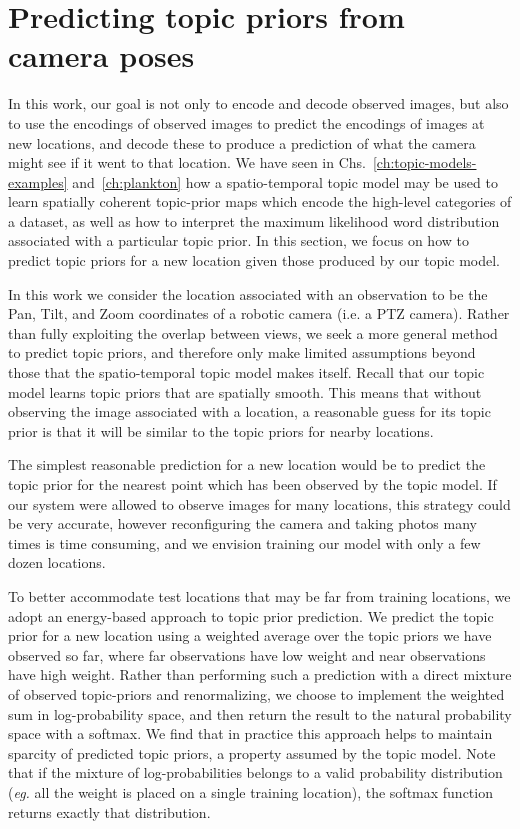 \section{Predicting topic priors from camera poses} \label{sec:spatial-prediction-spatial-model}
In this work, our goal is not only to encode and decode observed images, but also to use the encodings of observed images to predict the encodings of images at new locations, and decode these to produce a prediction of what the camera might see if it went to that location. We have seen in Chs.~\ref{ch:topic-models-examples} and~\ref{ch:plankton} how a spatio-temporal topic model may be used to learn spatially coherent topic-prior maps which encode the high-level categories of a dataset, as well as how to interpret the maximum likelihood word distribution associated with a particular topic prior. In this section, we focus on how to predict topic priors for a new location given those produced by our topic model.

In this work we consider the location associated with an observation to be the Pan, Tilt, and Zoom coordinates of a robotic camera (i.e. a PTZ camera). Rather than fully exploiting the overlap between views, we seek a more general method to predict topic priors, and therefore only make limited assumptions beyond those that the spatio-temporal topic model makes itself. Recall that our topic model learns topic priors that are spatially smooth. This means that without observing the image associated with a location, a reasonable guess for its topic prior is that it will be similar to the topic priors for nearby locations.

The simplest reasonable prediction for a new location would be to predict the topic prior for the nearest point which has been observed by the topic model. If our system were allowed to observe images for many locations, this strategy could be very accurate, however reconfiguring the camera and taking photos many times is time consuming, and we envision training our model with only a few dozen locations.

To better accommodate test locations that may be far from training locations, we adopt an energy-based approach to topic prior prediction. We predict the topic prior for a new location using a weighted average over the topic priors we have observed so far, where far observations have low weight and near observations have high weight. Rather than performing such a prediction with a direct mixture of observed topic-priors and renormalizing, we choose to implement the weighted sum in log-probability space, and then return the result to the natural probability space with a softmax. We find that in practice this approach helps to maintain sparcity of predicted topic priors, a property assumed by the topic model. Note that if the mixture of log-probabilities belongs to a valid probability distribution (\emph{eg.} all the weight is placed on a single training location), the softmax function returns exactly that distribution.

